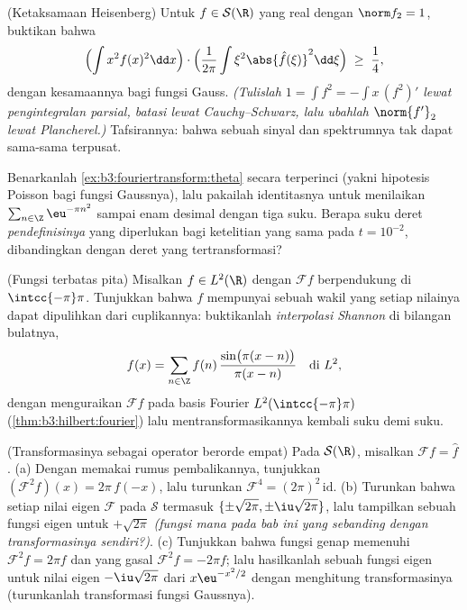 \begin{exercise}[$\star\star\star$]\label{exo:b3:fouriertransform:8}
(Ketaksamaan Heisenberg) Untuk $f \in \mathcal S(\R)$ yang real dengan
$\norm f_2 = 1$, buktikan bahwa
\[
\Bigl(\int x^2f(x)^2\dd x\Bigr)\cdot
\Bigl(\frac1{2\pi}\int \xi^2\abs{\hat f(\xi)}^2\dd\xi\Bigr)
\;\geq\; \frac14 ,
\]
dengan kesamaannya bagi fungsi Gauss. \emph{(Tulislah $1 = \int f^2 =
-\int x\,(f^2)'$ lewat pengintegralan parsial, batasi lewat Cauchy--Schwarz, lalu
ubahlah $\norm{f'}_2$ lewat Plancherel.)} Tafsirannya: bahwa sebuah
sinyal dan spektrumnya tak dapat sama-sama terpusat.
\end{exercise}

\begin{exercise}[$\star\star$]\label{exo:b3:fouriertransform:9}
Benarkanlah \cref{ex:b3:fouriertransform:theta} secara terperinci
(yakni hipotesis Poisson bagi fungsi Gaussnya), lalu pakailah identitasnya
untuk menilaikan $\sum_{n\in\Z}\eu^{-\pi n^2}$ sampai enam desimal dengan
tiga suku. Berapa suku deret \emph{pendefinisinya}
yang diperlukan bagi ketelitian yang sama pada $t = 10^{-2}$, dibandingkan dengan
deret yang tertransformasi?
\end{exercise}

\begin{exercise}[$\star\star$]\label{exo:b3:fouriertransform:10}
(Fungsi terbatas pita) Misalkan $f \in L^2(\R)$ dengan $\mathcal Ff$
berpendukung di $\intcc{-\pi}\pi$. Tunjukkan bahwa $f$ mempunyai sebuah
wakil yang setiap nilainya dapat dipulihkan
dari cuplikannya: buktikanlah \emph{interpolasi Shannon} di
bilangan bulatnya,
\[
f(x) = \sum_{n\in\Z} f(n)\,
\frac{\sin\bigl(\pi(x - n)\bigr)}{\pi(x - n)}
\quad\text{di } L^2,
\]
dengan menguraikan $\mathcal Ff$ pada basis Fourier
$L^2(\intcc{-\pi}\pi)$ (\cref{thm:b3:hilbert:fourier}) lalu
mentransformasikannya kembali suku demi suku.
\end{exercise}

\begin{exercise}[$\star\star$]\label{exo:b3:fouriertransform:11}
(Transformasinya sebagai operator berorde empat) Pada $\mathcal
S(\R)$, misalkan $\mathcal F f = \hat f$.
(a) Dengan memakai rumus pembalikannya, tunjukkan $(\mathcal F^2f)(x) =
2\pi\,f(-x)$, lalu turunkan $\mathcal F^4 = (2\pi)^2\,
\mathrm{id}$.
(b) Turunkan bahwa setiap nilai eigen $\mathcal F$ pada
$\mathcal S$ termasuk $\{\pm\sqrt{2\pi},
\pm\iu\sqrt{2\pi}\}$, lalu tampilkan sebuah fungsi eigen untuk
$+\sqrt{2\pi}$ \emph{(fungsi mana pada bab ini yang
sebanding dengan transformasinya sendiri?)}.
(c) Tunjukkan bahwa fungsi genap memenuhi $\mathcal F^2f = 2\pi
f$ dan yang gasal $\mathcal F^2f = -2\pi f$; lalu hasilkanlah sebuah
fungsi eigen untuk nilai eigen $-\iu\sqrt{2\pi}$ dari
$x\eu^{-x^2/2}$ dengan menghitung transformasinya (turunkanlah
transformasi fungsi Gaussnya).
\end{exercise}

